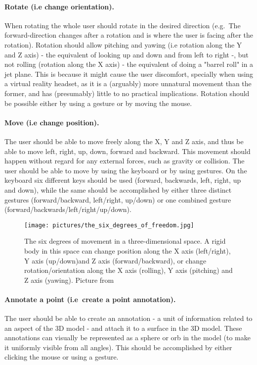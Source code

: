 \paragraph{Rotate (i.e change orientation).} When rotating the whole user should rotate in the desired direction 
(e.g.~The forward-direction changes after a rotation and is where the user is facing after the rotation).
Rotation should allow pitching and yawing (i.e rotation along the Y and Z axis) - the equivalent of looking up and down and from left to right -, 
but not rolling (rotation along the X axis) - the equivalent of doing a "barrel roll" in a jet plane. 
This is because it might cause the user discomfort, specially when using a virtual reality headset, as it is a (arguably) more unnatural movement than the former, and 
has (presumably) little to no practical implications. Rotation should be possible either by using a gesture or by moving the mouse.


\paragraph{Move (i.e change position).} The user should be able to move freely along the X, Y and Z axis, and thus be able to move left, right, up, down, forward and backward. 
This movement should happen without regard for any external forces, such as gravity or collision. The user should be able to move by using the keyboard or 
by using gestures. On the keyboard six different keys should be used (forward, backwards, left, right, up and down), while the same should be accomplished by
either three distinct gestures (forward/backward, left/right, up/down) or one combined gesture (forward/backwards/left/right/up/down).

\begin{figure}%
	\texttt{[image: pictures/the\_six\_degrees\_of\_freedom.jpg]}
	\caption[The six degrees of freedom]{The six degrees of movement in a three-dimensional space. A rigid body in this space can change position along the X axis (left/right), 
	Y axis (up/down)and Z axis (forward/backward), or change rotation/orientation along the X axis (rolling), Y axis (pitching) and Z axis (yawing).
	Picture from \citet{6DOF}}
	\label{fig:the_six_degrees_of_freedom}
\end{figure} 

\paragraph{Annotate a point (i.e~create a point annotation).} The user should be able to create an annotation - a unit of information related to an aspect of the 3D model - 
and attach it to a surface in the 3D model. 
These annotations can visually be represented as a sphere or orb in the model (to make it uniformly visible from all angles). This should be accomplished by
either clicking the mouse or using a gesture. 

